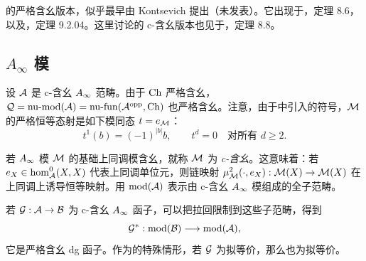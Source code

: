 \begin{note}\label{st:2.11}
的严格含幺版本，似乎最早由 Kontsevich 提出（未发表）。它出现于，定理 8.6，以及，定理 9.2.04。这里讨论的 c-含幺版本也见于，定理 8.8。
\end{note}

\subsection{\texorpdfstring{$A_\infty$}{A∞} 模}\label{sec:2f}
设 $\mathcal A$ 是 c-含幺 $A_\infty$ 范畴。由于 $\operatorname{Ch}$ 严格含幺，$\mathcal Q=\operatorname{nu\text{-}mod}(\mathcal A)=\operatorname{nu\text{-}fun}(\mathcal A^{\mathrm{opp}},\operatorname{Ch})$ 也严格含幺。注意，由于中引入的符号，$\mathcal M$ 的严格恒等态射是如下模同态 $t=e_{\mathcal M}$：
\begin{equation}\label{eq:2.10}
t^1(b)=(-1)^{|b|}b,\qquad t^d=0\quad\text{对所有 }d\geq2.
\end{equation}
\begin{definition*}
若 $A_\infty$ 模 $\mathcal M$ 的基础上同调模含幺，就称 $\mathcal M$ 为 \emph{c-含幺}。这意味着：若 $e_X\in\hom^0_{\mathcal A}(X,X)$ 代表上同调单位元，则链映射 $\mu^2_{\mathcal M}(\cdot,e_X):\mathcal M(X)\to\mathcal M(X)$ 在上同调上诱导恒等映射。用 $\operatorname{mod}(\mathcal A)$ 表示由 c-含幺 $A_\infty$ 模组成的全子范畴。
\end{definition*}
若 $\mathcal G:\mathcal A\to\mathcal B$ 为 c-含幺 $A_\infty$ 函子，可以把拉回限制到这些子范畴，得到
\begin{equation}\label{eq:2.11}
\mathcal G^*:\operatorname{mod}(\mathcal B)\longrightarrow\operatorname{mod}(\mathcal A),
\end{equation}
它是严格含幺 dg 函子。作为的特殊情形，若 $\mathcal G$ 为拟等价，那么也为拟等价。

